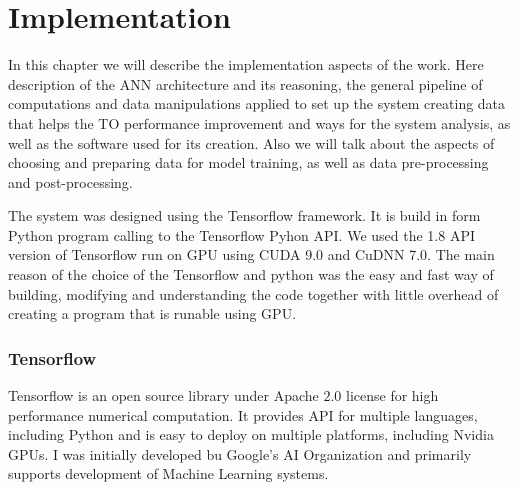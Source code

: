 
\chapter{Implementation}

In this chapter we will describe the implementation aspects of the work.
Here description of the ANN architecture and its reasoning, the general pipeline of computations and data manipulations applied to set up the system creating data that helps the TO performance improvement and ways for the system analysis, as well as the software used for its creation.
Also we will talk about the aspects of choosing and preparing data for model training, as well as data pre-processing and post-processing.
\medskip


The system was designed using the Tensorflow framework. 
It is build in form Python program calling to the Tensorflow Pyhon API.
We used the 1.8 API version of Tensorflow run on GPU using CUDA 9.0 and CuDNN 7.0.
The main reason of the choice of the Tensorflow and python was the easy and fast way of building, modifying and understanding the code together with little overhead of
creating a program that is runable using GPU. 
\medskip


\subsection{Tensorflow}

Tensorflow is an open source library under Apache $2.0$ license for high performance numerical computation\cite{tensorflow_main}.
It provides API for multiple languages, including Python and is easy to deploy on multiple platforms, including Nvidia GPUs.
I was initially developed bu Google's AI Organization and primarily supports development of Machine Learning systems.
\medskip

